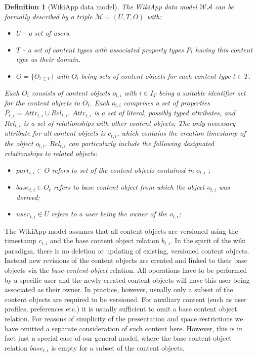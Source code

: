 \documentclass[ngerman,UKenglish,table]{scrbook}
\newtheorem{definition}{Definition}
\begin{document}
\begin{definition}[WikiApp data model]
\label{def:dm}
The WikiApp data model $\mathcal{WA}$ can be formally described by a triple $\mathcal{M}=(U,T,O)$ with:
\begin{itemize}
	\item $U$ - a set of \emph{users}.
	\item $T$ - a set of \emph{content types} with associated property types $P_t$ having this content type as their domain.
	\item $O=\{O_{t \in T}\}$ with $O_t$ being \emph{sets of content objects} for each content type $t \in T$.
\end{itemize}
	Each $O_t$ consists of content objects $o_{t,i}$ with $i \in I_T$ being a suitable \emph{identifier} set for the content objects in $O_t$.
	Each $o_{t,i}$ comprises a set of properties $P_{t,i} = Attr_{t,i} \cup Rel_{t,i}$.
	$Attr_{t,i}$ is a set of literal, possibly typed \emph{attributes}, and $Rel_{t,i}$ is a set of \emph{relationships} with other content objects;
	The only necessary attribute for all content objects is $c_{t,i}$, which contains the creation timestamp of the object $o_{t,i}$.
	$Rel_{t,i}$ can particularly include the following designated relationships to related objects:
	\begin{itemize}
		\item $part_{t,i} \subset O$ refers to \emph{set of the content objects} contained in $o_{t,i}$ ;
		\item $base_{t,i} \in O_t$ refers to \emph{base content object} from which the object $o_{t,i}$ was derived;
		\item $user_{t,i} \in U$ refers to a user being the \emph{owner} of the $o_{t,i}$;		
	\end{itemize}
\end{definition}

The WikiApp model assumes that all content objects are versioned using the timestamp $c_{t,i}$ and the base content object relation $b_{t,i}$.
In the spirit of the wiki paradigm, there is no deletion or updating of existing, versioned content objects.
Instead new revisions of the content objects are created and linked to their base objects via the \textit{base-content-object} relation.
All operations have to be performed by a specific user and the newly created content objects will have this user being associated as their owner.
In practice, however, usually only a subset of the content objects are required to be versioned.
For auxiliary content (such as user profiles, preferences etc.) it is usually sufficient to omit a base content object relation.
For reasons of simplicity of the presentation and space restrictions we have omitted a separate consideration of such content here.
However, this is in fact just a special case of our general model, where the base content object relation $base_{t,i}$ is empty for a subset of the content objects.
\end{document}
